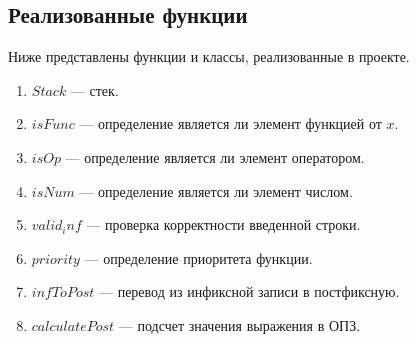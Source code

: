 \documentclass[12pt, a4paper]{article}
\begin{document}
\subsection{Реализованные функции}
Ниже представлены функции и классы, реализованные в проекте.
\begin{enumerate}
	\item $Stack$ --- стек.
	\item $isFunc$ --- определение является ли элемент функцией от $x$.
	\item $isOp$ --- определение является ли элемент оператором.
	\item $isNum$ --- определение является ли элемент числом.
	\item $valid_inf$ --- проверка корректности введенной строки.
	\item $priority$ --- определение приоритета функции.
	\item $infToPost$ --- перевод из инфиксной записи в постфиксную.
	\item $calculatePost$ --- подсчет значения выражения в ОПЗ.
\end{enumerate}
\newpage
\end{document}
